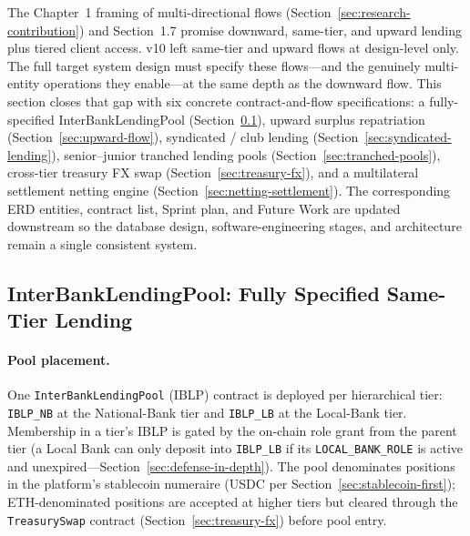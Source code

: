\documentclass[12pt,a4paper]{report}
\begin{document}
The Chapter~1 framing of multi-directional flows (Section~\ref{sec:research-contribution}) and Section~1.7 promise downward, same-tier, and upward lending plus tiered client access. v10 left same-tier and upward flows at design-level only. The full target system design must specify these flows---and the genuinely multi-entity operations they enable---at the same depth as the downward flow. This section closes that gap with six concrete contract-and-flow specifications: a fully-specified InterBankLendingPool (Section~\ref{sec:interbank-pool}), upward surplus repatriation (Section~\ref{sec:upward-flow}), syndicated / club lending (Section~\ref{sec:syndicated-lending}), senior--junior tranched lending pools (Section~\ref{sec:tranched-pools}), cross-tier treasury FX swap (Section~\ref{sec:treasury-fx}), and a multilateral settlement netting engine (Section~\ref{sec:netting-settlement}). The corresponding ERD entities, contract list, Sprint plan, and Future Work are updated downstream so the database design, software-engineering stages, and architecture remain a single consistent system.

\subsection{InterBankLendingPool: Fully Specified Same-Tier Lending}
\label{sec:interbank-pool}

\paragraph{Pool placement.}
One \texttt{InterBankLendingPool} (IBLP) contract is deployed per hierarchical tier: \texttt{IBLP\_NB} at the National-Bank tier and \texttt{IBLP\_LB} at the Local-Bank tier. Membership in a tier's IBLP is gated by the on-chain role grant from the parent tier (a Local Bank can only deposit into \texttt{IBLP\_LB} if its \texttt{LOCAL\_BANK\_ROLE} is active and unexpired---Section~\ref{sec:defense-in-depth}). The pool denominates positions in the platform's stablecoin numeraire (USDC per Section~\ref{sec:stablecoin-first}); ETH-denominated positions are accepted at higher tiers but cleared through the \texttt{TreasurySwap} contract (Section~\ref{sec:treasury-fx}) before pool entry.
\end{document}
